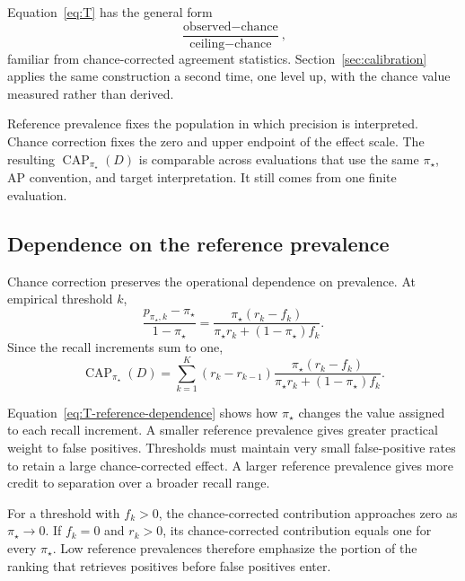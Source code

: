 \documentclass[11pt]{article}
\newcommand{\CAP}{\operatorname{CAP}}
\newcommand{\Tpi}{\CAP_{\pi_\star}}
\theoremstyle{remark}
\begin{document}
Equation~\eqref{eq:T} has the general form
\begin{equation}
\frac{\text{observed}-\text{chance}}{\text{ceiling}-\text{chance}},
\label{eq:kappa-form}
\end{equation}
familiar from chance-corrected agreement statistics. Section~\ref{sec:calibration} applies the same construction a second time, one level up, with the chance value measured rather than derived.

Reference prevalence fixes the population in which precision is interpreted. Chance correction fixes the zero and upper endpoint of the effect scale. The resulting $\Tpi(D)$ is comparable across evaluations that use the same $\pi_\star$, AP convention, and target interpretation. It still comes from one finite evaluation.

\subsection{Dependence on the reference prevalence}

Chance correction preserves the operational dependence on prevalence. At empirical threshold $k$,
\begin{equation}
\frac{p_{\pi_\star,k}-\pi_\star}{1-\pi_\star}
=
\frac{\pi_\star(r_k-f_k)}
{\pi_\star r_k+(1-\pi_\star)f_k}.
\label{eq:threshold-normalized-effect}
\end{equation}
Since the recall increments sum to one,
\begin{equation}
\Tpi(D)
=
\sum_{k=1}^{K}
(r_k-r_{k-1})
\frac{\pi_\star(r_k-f_k)}
{\pi_\star r_k+(1-\pi_\star)f_k}.
\label{eq:T-reference-dependence}
\end{equation}

Equation~\eqref{eq:T-reference-dependence} shows how $\pi_\star$ changes the value assigned to each recall increment. A smaller reference prevalence gives greater practical weight to false positives. Thresholds must maintain very small false-positive rates to retain a large chance-corrected effect. A larger reference prevalence gives more credit to separation over a broader recall range.

For a threshold with $f_k>0$, the chance-corrected contribution approaches zero as $\pi_\star\to0$. If $f_k=0$ and $r_k>0$, its chance-corrected contribution equals one for every $\pi_\star$. Low reference prevalences therefore emphasize the portion of the ranking that retrieves positives before false positives enter.
\end{document}
